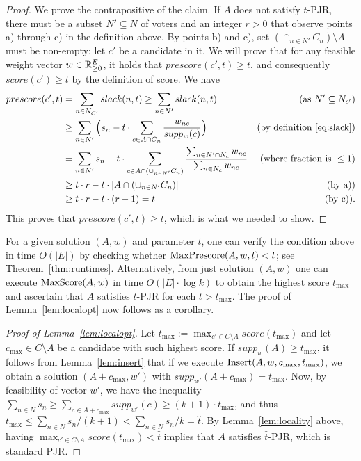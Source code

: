 \begin{proof} 
We prove the contrapositive of the claim. If $A$ does not satisfy $t$-PJR, there must be a subset $N'\subseteq N$ of voters and an integer $r>0$ that observe points a) through c) in the definition above. By points b) and c), set $(\cap_{n\in N'} C_n)\setminus A$ must be non-empty: let $c'$ be a candidate in it. 
We will prove that for any feasible weight vector $w\in \mathbb{R}_{\geq 0}^E$, it holds that $prescore(c',t)\geq t$, and consequently $score(c')\geq t$ by the definition of score. We have
%
\begin{align*} 
prescore(c',t) &= \sum_{n\in N_{C'}}  slack(n,t) \geq \sum_{n\in N'} slack(n,t) & (\text{as } N'\subseteq N_{c'}) \\
&\geq \sum_{n\in N'} \Big(s_n - t\cdot \sum_{c\in A\cap C_n} \frac{w_{nc}}{supp_w(c)}\Big)  
& (\text{by definition \ref{eq:slack}})\\
&= \sum_{n\in N'} s_n - t \cdot \sum_{c\in A\cap (\cup_{n\in N'} C_n)} 
\frac{\sum_{n\in N'\cap N_c} w_{nc}}{\sum_{n\in N_c} w_{nc}} 
& (\text{where fraction is } \leq 1)\\ 
& \geq t\cdot r - t\cdot |A\cap (\cup_{n\in N'} C_n)| & (\text{by a)})\\
& \geq t\cdot r - t\cdot (r-1) = t & (\text{by c)}). 
\end{align*}
%
This proves that $prescore(c',t) \geq t$, which is what we needed to show.
\end{proof}

For a given solution $(A,w)$ and parameter $t$, one can verify the condition above in time $O(|E|)$ by checking whether $\operatorname{MaxPrescore}(A,w,t)<t$; see Theorem~\ref{thm:runtimes}. Alternatively, from just solution $(A,w)$ one can execute $\operatorname{MaxScore}(A,w)$ in time $O(|E|\cdot \log k)$ to obtain the highest score $t_{\max}$ and ascertain that $A$ satisfies $t$-PJR for each $t>t_{\max}$. 
The proof of Lemma~\ref{lem:localopt} now follows as a corollary.

\begin{proof}[Proof of Lemma~\ref{lem:localopt}]
Let $t_{\max}:=\max_{c'\in C\setminus A} score(t_{\max})$ and let $c_{\max}\in C\setminus A$ be a candidate with such highest score. 
If $supp_w(A)\geq t_{\max}$, it follows from Lemma~\ref{lem:insert} that if we execute $\operatorname{Insert}(A,w,c_{\max}, t_{\max})$, we obtain a solution $(A+c_{\max}, w')$ with $supp_{w'}(A+c_{\max})=t_{\max}$. 
Now, by feasibility of vector $w'$, we have the inequality $\sum_{n\in N} s_n \geq \sum_{c\in A+c_{\max}} supp_{w'}(c) \geq (k+1)\cdot t_{\max}$, and thus $t_{\max}\leq \sum_{n\in N} s_n / (k+1) < \sum_{n\in N} s_n / k = \hat{t}$. 
By Lemma~\ref{lem:locality} above, having $\max_{c'\in C\setminus A} score(t_{\max}) < \hat{t}$ implies that $A$ satisfies $\hat{t}$-PJR, which is standard PJR.
\end{proof}

